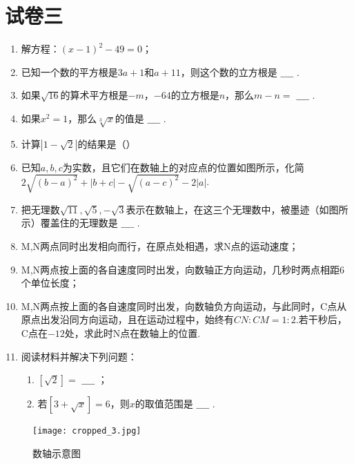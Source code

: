 \documentclass[12pt]{ctexart}
\begin{document}
\section*{试卷三}
\begin{enumerate}[label=\arabic*.]
    \item 解方程：$(x-1)^2-49=0$；
    \item 已知一个数的平方根是$3a+1$和$a+11$，则这个数的立方根是 $\_\_\_\_$ .
    \item 如果$\sqrt{16}$的算术平方根是$-m$，$-64$的立方根是$n$，那么$m-n=$ $\_\_\_\_$ .
    \item 如果$x^2=1$，那么$\sqrt[3]{x}$的值是 $\_\_\_\_$ .
    \item 计算$|1-\sqrt{2}|$的结果是（）
    \item 已知$a,b,c$为实数，且它们在数轴上的对应点的位置如图所示，化简$2\sqrt{(b-a)^2}+|b+c|-\sqrt{(a-c)^2}-2|a|$.
    \item 把无理数$\sqrt{11},\sqrt{5},-\sqrt{3}$表示在数轴上，在这三个无理数中，被墨迹（如图所示）覆盖住的无理数是 $\_\_\_\_$ .
    \item M,N两点同时出发相向而行，在原点处相遇，求N点的运动速度；
    \item M,N两点按上面的各自速度同时出发，向数轴正方向运动，几秒时两点相距6个单位长度；
    \item M,N两点按上面的各自速度同时出发，向数轴负方向运动，与此同时，C点从原点出发沿同方向运动，且在运动过程中，始终有$CN:CM=1:2$.若干秒后，C点在$-12$处，求此时N点在数轴上的位置.
    \item 阅读材料并解决下列问题：
        \begin{enumerate}
            \item $[\sqrt{2}]=$ $\_\_\_\_$ ；
            \item 若$[3+\sqrt{x}]=6$，则$x$的取值范围是 $\_\_\_\_$ .
        \end{enumerate}
\end{enumerate}

\begin{figure}[H]
    \centering
    \texttt{[image: cropped\_3.jpg]}
    \caption{数轴示意图}
\end{figure}
\end{document}
